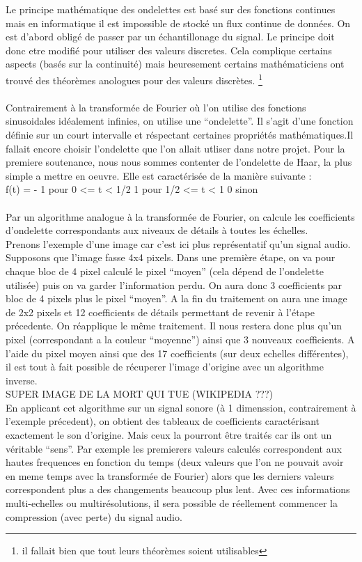 \documentclass[a4paper,12pt]{article}
\begin{document}
Le principe mathématique des ondelettes est basé sur des fonctions continues
mais en informatique il est impossible de stocké un flux continue de données. On
est d'abord obligé de passer par un échantillonage du signal. Le principe doit
donc etre modifié pour utiliser des valeurs discretes. Cela complique certains
aspects (basés sur la continuité) mais heuresement certains mathématiciens ont
trouvé des théorèmes anologues pour des valeurs discrètes. \footnote{il fallait bien que
tout leurs théorèmes soient utilisables}\\\\
Contrairement à la transformée de Fourier où l'on utilise des fonctions
sinusoidales idéalement infinies, on utilise une ``ondelette''. Il s'agit d'une
fonction définie sur un court intervalle et réspectant certaines propriétés
mathématiques.Il fallait encore choisir l'ondelette que l'on allait utliser dans
notre projet.  Pour la premiere soutenance, nous nous sommes contenter de
l'ondelette de Haar, la plus simple a mettre en oeuvre. Elle est caractérisée de
la manière suivante :\\

f(t) = 
- 1 pour 0 <= t < 1/2
1 pour 1/2 <= t < 1
0 sinon
\\\\

Par un algorithme analogue à la transformée de Fourier, on calcule les
coefficients d'ondelette correspondants aux niveaux de détails à toutes les
échelles.\\
Prenons l'exemple d'une image car c'est ici plus représentatif qu'un signal
audio. Supposons que l'image fasse 4x4 pixels. Dans une première étape, on va
pour chaque bloc de 4 pixel calculé le pixel ``moyen'' (cela dépend de
l'ondelette utilisée) puis on va garder l'information perdu. On aura donc 3
coefficients par bloc de 4 pixels plus le pixel ``moyen''. A la fin du
traitement on aura une image de 2x2 pixels et 12 coefficients de détails
permettant de revenir à l'étape précedente. On réapplique le même traitement. Il
nous restera donc plus qu'un pixel (correspondant a la couleur ``moyenne'')
ainsi que 3 nouveaux coefficients. A l'aide du pixel moyen ainsi que des 17
coefficients (sur deux echelles différentes), il est tout à fait possible de
récuperer l'image d'origine avec un algorithme inverse.\\
SUPER IMAGE DE LA MORT QUI TUE (WIKIPEDIA ???)
\\
En applicant cet algorithme sur un signal sonore (à 1 dimenssion,
contrairement à l'exemple précedent), on obtient des tableaux de
coefficients caractérisant exactement le son d'origine. Mais ceux la
pourront être traités car ils ont un véritable ``sens''. Par exemple
les premierers valeurs calculés correspondent aux hautes frequences en
fonction du temps (deux valeurs que l'on ne pouvait avoir en meme
temps avec la transformée de Fourier) alors que les derniers valeurs
correspondent plus a des changements beaucoup plus lent. Avec ces
informations multi-echelles ou multirésolutions, il sera possible de
réellement commencer la compression (avec perte) du signal audio.
\end{document}

